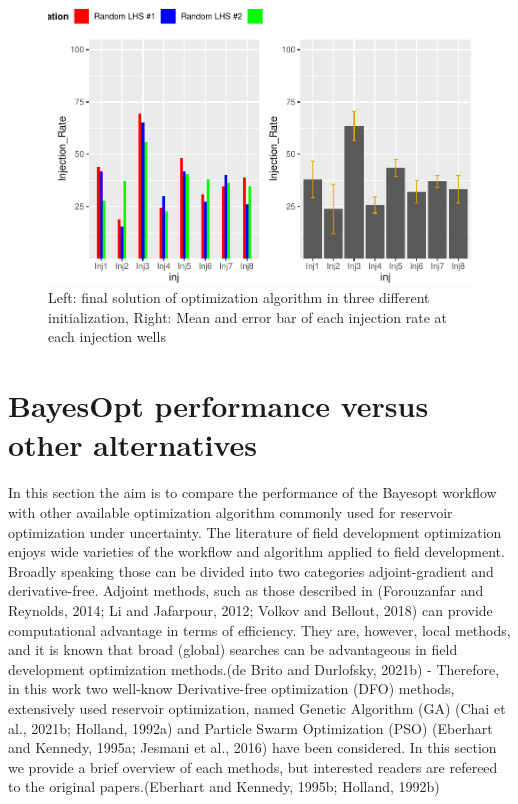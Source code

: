 \documentclass[]{elsarticle} %
\begin{document}
\begin{figure}

{\centering \includegraphics[width=0.9\linewidth]{0_Paper1_main_files/figure-latex/diffu-1} 

}

\caption{Left: final solution of optimization algorithm in three different initialization, Right: Mean and error bar of each injection rate at each injection wells}\label{fig:diffu}
\end{figure}

\newpage

\newpage

\hypertarget{bayesopt-performance-versus-other-alternatives}{%
\section{BayesOpt performance versus other alternatives}\label{bayesopt-performance-versus-other-alternatives}}

In this section the aim is to compare the performance of the Bayesopt workflow with other available optimization algorithm commonly used for reservoir optimization under uncertainty. The literature of field development optimization enjoys wide varieties of the workflow and algorithm applied to field development. Broadly speaking those can be divided into two categories adjoint-gradient and derivative-free. Adjoint methods, such as those described in (Forouzanfar and Reynolds, 2014; Li and Jafarpour, 2012; Volkov and Bellout, 2018) can provide computational advantage in terms of efficiency. They are, however, local methods, and it is known that broad (global) searches can be advantageous in field development optimization methods.(de Brito and Durlofsky, 2021b) - Therefore, in this work two well-know Derivative-free optimization (DFO) methods, extensively used reservoir optimization, named Genetic Algorithm (GA) (Chai et al., 2021b; Holland, 1992a) and Particle Swarm Optimization (PSO) (Eberhart and Kennedy, 1995a; Jesmani et al., 2016) have been considered. In this section we provide a brief overview of each methods, but interested readers are refereed to the original papers.(Eberhart and Kennedy, 1995b; Holland, 1992b)
\end{document}
